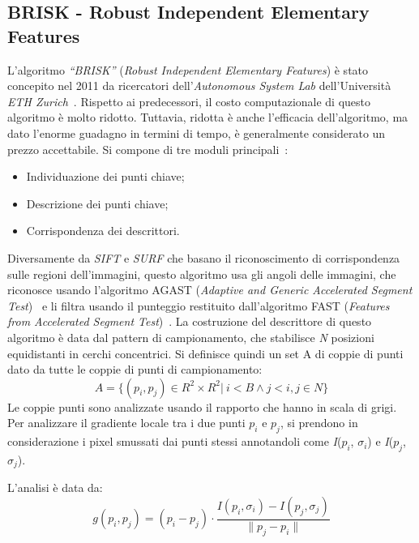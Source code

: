 \subsection{BRISK - Robust Independent Elementary Features}
\noindent L'algoritmo \textit{``BRISK''} (\textit{Robust Independent Elementary Features}) è stato concepito nel 2011 da ricercatori dell'\textit{Autonomous System Lab} dell'Università \textit{ETH Zurich}~\cite{6126542}. Rispetto ai predecessori, il costo computazionale di questo algoritmo è molto ridotto. Tuttavia, ridotta è anche l'efficacia dell'algoritmo, ma dato l'enorme guadagno in termini di tempo, è generalmente considerato un prezzo accettabile.
\noindent Si compone di tre moduli principali~\cite{Liu2018-ds}: 
\begin{itemize}
	\item Individuazione dei punti chiave;
	\item Descrizione dei punti chiave; 
	\item Corrispondenza dei descrittori.
\end{itemize}
\noindent Diversamente da \textit{SIFT} e \textit{SURF} che basano il riconoscimento di corrispondenza sulle regioni dell'immagini, questo algoritmo usa gli angoli delle immagini, che riconosce usando l'algoritmo AGAST (\textit{Adaptive and Generic Accelerated Segment Test})~\cite{10.1007/978-3-642-15552-9_14} e li filtra usando il punteggio restituito dall'algoritmo FAST (\textit{Features from Accelerated Segment Test})~\cite{Rosten2010-yf}. \hfill \break
\noindent La costruzione del descrittore di questo algoritmo è data dal pattern di campionamento, che stabilisce \textit{N} posizioni equidistanti in cerchi concentrici. Si definisce quindi un set A di coppie di punti dato da tutte le coppie di punti di campionamento:
\begin{equation}
	A = \{ (p_{i}, p_{j}) \in R^{2} \times R^{2} |\ i < B \wedge j < i, j \in \textit{N} \}
\end{equation}
\noindent Le coppie punti sono analizzate usando il rapporto che hanno in scala di grigi.
Per analizzare il gradiente locale tra i due punti \(p_{i}\) e \(p_{j}\), si prendono in considerazione i pixel smussati dai punti stessi annotandoli come \textit{I}(\(p_{i}\), \(\sigma_{i}\)) e \textit{I}(\(p_{j}\), \(\sigma_{j}\)). \par
\noindent L'analisi è data da:
\begin{equation}
	g(p_{i}, p_{j}) = (p_{i} - p_{j}) \cdot \frac{\textit{I}(p_{i}, \sigma_{i}) - \textit{I}(p_{j}, \sigma_{j})}{\|p_{j} - p_{i}\|}
\end{equation}
